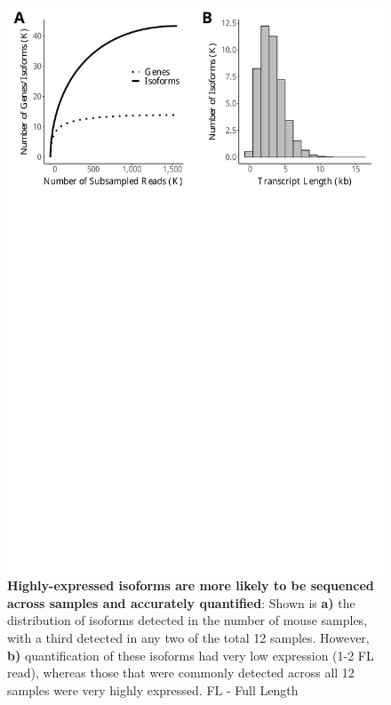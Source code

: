 \begin{figure}[htp]
	\begin{center}
		\includegraphics[page=4,trim={0 25cm 0 0},clip,scale = 0.55]{Figures/IsoSeqWholeTranscriptome.pdf}
	\end{center}
	\captionsetup{width=0.95\textwidth}
	\caption[Isoform diversity across Tg4510 samples and coverage of ERCC transcripts]%
	{\textbf{Highly-expressed isoforms are more likely to be sequenced across samples and accurately quantified}: Shown is \textbf{a)} the distribution of isoforms detected in the number of mouse samples, with a third detected in any two of the total 12 samples. However, \textbf{b)} quantification of these isoforms had very low expression (1-2 FL read), whereas those that were commonly detected across all 12 samples were very highly expressed. FL - Full Length}
	\label{fig:isoseq_whole_lowlyexp}
\end{figure}

